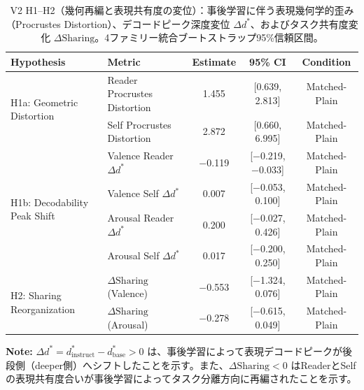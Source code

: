 \begin{table}[htbp]
\centering
\small
\caption{V2 H1--H2（幾何再編と表現共有度の変位）：事後学習に伴う表現幾何学的歪み（Procrustes Distortion）、デコードピーク深度変位 $\Delta d^*$、およびタスク共有度変化 $\Delta\text{Sharing}$。4ファミリー統合ブートストラップ95\%信頼区間。}
\label{tab:v2_h1_h2_reorganization}
\begin{tabular}{ll ccc}
\toprule
\textbf{Hypothesis} & \textbf{Metric} & \textbf{Estimate} & \textbf{95\% CI} & \textbf{Condition} \\
\midrule
\multirow{2}{*}{H1a: Geometric Distortion} & Reader Procrustes Distortion         & 1.455    & [0.639, 2.813]     & Matched-Plain \\
                                 & Self Procrustes Distortion           & 2.872    & [0.660, 6.995]     & Matched-Plain \\
\midrule
\multirow{4}{*}{H1b: Decodability Peak Shift} & Valence Reader $\Delta d^*$          & $-$0.119 & [$-$0.219, $-$0.033] & Matched-Plain \\
                                 & Valence Self $\Delta d^*$            & 0.007    & [$-$0.053, 0.100]  & Matched-Plain \\
                                 & Arousal Reader $\Delta d^*$          & 0.200    & [$-$0.027, 0.426]  & Matched-Plain \\
                                 & Arousal Self $\Delta d^*$            & 0.017    & [$-$0.200, 0.250]  & Matched-Plain \\
\midrule
\multirow{2}{*}{H2: Sharing Reorganization} & $\Delta\text{Sharing}$ (Valence)     & $-$0.553 & [$-$1.324, 0.076]  & Matched-Plain \\
                                 & $\Delta\text{Sharing}$ (Arousal)     & $-$0.278 & [$-$0.615, 0.049]  & Matched-Plain \\
\bottomrule
\end{tabular}
\vspace{1ex}
\begin{minipage}{\linewidth}
\footnotesize
\textbf{Note:} $\Delta d^* = d^*_{\text{instruct}} - d^*_{\text{base}} > 0$ は、事後学習によって表現デコードピークが後段側（deeper側）へシフトしたことを示す。また、$\Delta\text{Sharing} < 0$ はReaderとSelfの表現共有度合いが事後学習によってタスク分離方向に再編されたことを示す。
\end{minipage}
\end{table}